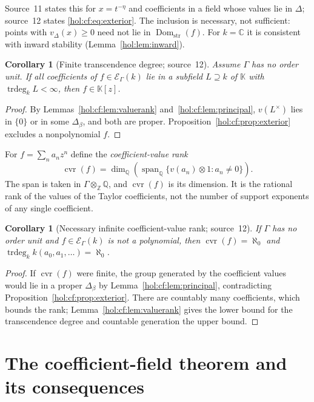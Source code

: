 \documentclass[11pt]{article}
\numberwithin{equation}{section}
\newtheorem{corollary}[theorem]{Corollary}
\theoremstyle{definition}
\theoremstyle{remark}
\newcommand{\C}{\mathbb C}
\newcommand{\Q}{\mathbb Q}
\newcommand{\Z}{\mathbb Z}
\newcommand{\Dom}{\operatorname{Dom}_{\mathrm{str}}}
\newcommand{\KK}{\mathbb K}
\newcommand{\EK}{\mathcal E_\Gamma(k)}
\newcommand{\trdeg}{\operatorname{trdeg}}
\newcommand{\cvr}{\operatorname{cvr}}
\begin{document}
Source~11 states this for $x=t^{-\eta}$ and coefficients in a field whose
values lie in $\Delta$; source~12 states \eqref{hol:cf:eq:exterior}. The
inclusion is necessary, not sufficient: points with $v_\Delta(x)\ge0$ need not
lie in $\Dom(f)$. For $k=\C$ it is consistent with inward stability
(Lemma~\ref{hol:lem:inward}).

\begin{corollary}[Finite transcendence degree; source~12]
\label{hol:cf:cor:finitefield}
Assume $\Gamma$ has no order unit. If all coefficients of $f\in\EK$ lie in a
subfield $L\supseteq k$ of $\KK$ with $\trdeg_kL<\infty$, then $f\in\KK[z]$.
\end{corollary}

\begin{proof}
By Lemmas~\ref{hol:cf:lem:valuerank} and~\ref{hol:cf:lem:principal},
$v(L^\times)$ lies in $\{0\}$ or in some $\Delta_\beta$, and both are proper.
Proposition~\ref{hol:cf:prop:exterior} excludes a nonpolynomial $f$.
\end{proof}

For $f=\sum_na_nz^n$ define the \emph{coefficient-value rank}
\begin{equation}\label{hol:cf:eq:cvr}
 \cvr(f)=\dim_\Q\left(\operatorname{span}_\Q
 \{v(a_n)\otimes1:a_n\ne0\}\right).
\end{equation}
The span is taken in $\Gamma\otimes_\Z\Q$, and $\cvr(f)$ is its dimension.
It is the rational rank of the values of the Taylor coefficients, not the
number of support exponents of any single coefficient.

\begin{corollary}[Necessary infinite coefficient-value rank; source~12]
\label{hol:cf:cor:cvr}
If $\Gamma$ has no order unit and $f\in\EK$ is not a polynomial, then
$\cvr(f)=\aleph_0$ and $\trdeg_kk(a_0,a_1,\ldots)=\aleph_0$.
\end{corollary}

\begin{proof}
If $\cvr(f)$ were finite, the group generated by the coefficient values would
lie in a proper $\Delta_\beta$ by Lemma~\ref{hol:cf:lem:principal},
contradicting Proposition~\ref{hol:cf:prop:exterior}. There are countably
many coefficients, which bounds the rank; Lemma~\ref{hol:cf:lem:valuerank}
gives the lower bound for the transcendence degree and countable generation
the upper bound.
\end{proof}

\section{The coefficient-field theorem and its consequences}
\label{hol:cf:sec:coefficients}
\end{document}
